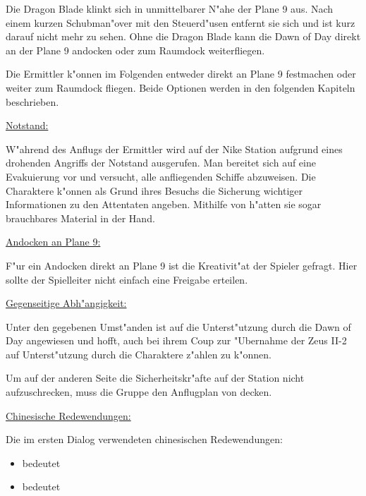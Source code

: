 Die Dragon Blade klinkt sich in unmittelbarer N"ahe der Plane 9 aus. Nach einem kurzen Schubman"over mit den Steuerd"usen entfernt sie sich und ist kurz darauf nicht mehr zu sehen. Ohne die Dragon Blade kann die Dawn of Day direkt an der Plane 9 andocken oder zum Raumdock weiterfliegen.
\vfill

\begin{remarks}
	Die Ermittler k"onnen im Folgenden entweder direkt an Plane 9 festmachen oder weiter zum Raumdock fliegen. Beide Optionen werden in den folgenden Kapiteln beschrieben.

	\underline{Notstand:}

	W"ahrend des Anflugs der Ermittler wird auf der Nike Station aufgrund eines drohenden Angriffs der Notstand ausgerufen. Man bereitet sich auf eine Evakuierung vor und versucht, alle anfliegenden Schiffe abzuweisen. Die Charaktere k"onnen als Grund ihres Besuchs die Sicherung wichtiger Informationen zu den Attentaten angeben. Mithilfe von \ml{} h"atten sie sogar brauchbares Material in der Hand.

	\underline{Andocken an Plane 9:}
	
	F"ur ein Andocken direkt an Plane 9 ist die Kreativit"at der Spieler gefragt. Hier sollte der Spielleiter nicht einfach eine Freigabe erteilen.

	\underline{Gegenseitige Abh"angigkeit:}

	Unter den gegebenen Umst"anden ist \xl{} auf die Unterst"utzung durch die Dawn of Day angewiesen und hofft, auch bei ihrem Coup zur "Ubernahme der Zeus II-2 auf Unterst"utzung durch die Charaktere z"ahlen zu k"onnen. 
	
	Um auf der anderen Seite die Sicherheitskr"afte auf der Station nicht aufzuschrecken, muss die Gruppe den Anflugplan von \xl{} decken.

	\underline{Chinesische Redewendungen:}

	Die im ersten Dialog verwendeten chinesischen Redewendungen:
	
	\begin{itemize}
		\item {} bedeutet 
		\item {} bedeutet 
	\end{itemize}
\end{remarks}
\vfill
\pagebreak